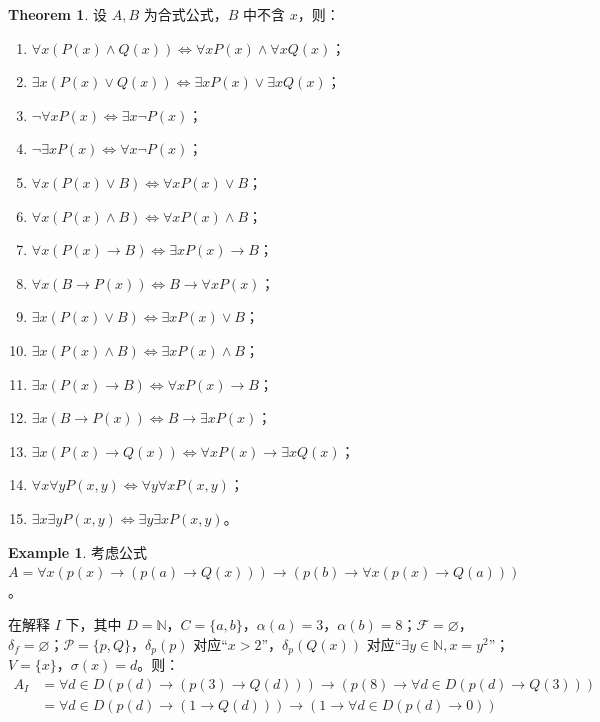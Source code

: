 \documentclass[oneside]{book}
\theoremstyle{definition}
\newtheorem{example}{Example}[section]
\newtheorem{theorem}{Theorem}[section]
\begin{document}
\begin{theorem}
	设 \( A,B \) 为合式公式，\( B \) 中不含 \( x \)，则：
	\begin{enumerate}
		\item \( \forall x(P(x) \land Q(x)) \Leftrightarrow \forall xP(x) \land \forall xQ(x) \)；
		\item \( \exists x(P(x) \lor Q(x)) \Leftrightarrow \exists xP(x) \lor \exists xQ(x) \)；
		\item \( \neg\forall xP(x) \Leftrightarrow \exists x\neg P(x) \)；
		\item \( \neg\exists xP(x) \Leftrightarrow \forall x\neg P(x) \)；
		\item \( \forall x(P(x) \lor B) \Leftrightarrow \forall xP(x) \lor B \)；
		\item \( \forall x(P(x) \land B) \Leftrightarrow \forall xP(x) \land B \)；
		\item \( \forall x(P(x) \to B) \Leftrightarrow \exists xP(x) \to B \)；
		\item \( \forall x(B \to P(x)) \Leftrightarrow B \to \forall xP(x) \)；
		\item \( \exists x(P(x) \lor B) \Leftrightarrow \exists xP(x) \lor B \)；
		\item \( \exists x(P(x) \land B) \Leftrightarrow \exists xP(x) \land B \)；
		\item \( \exists x(P(x) \to B) \Leftrightarrow \forall xP(x) \to B \)；
		\item \( \exists x(B \to P(x)) \Leftrightarrow B \to \exists xP(x) \)；
		\item \( \exists x(P(x) \to Q(x)) \Leftrightarrow \forall xP(x) \to \exists xQ(x) \)；
		\item \( \forall x\forall yP(x,y) \Leftrightarrow \forall y\forall xP(x,y) \)；
		\item \( \exists x\exists yP(x,y) \Leftrightarrow \exists y\exists xP(x,y) \)。
	\end{enumerate}
\end{theorem}
\begin{example}
	考虑公式 \( A = \forall x (p(x) \to (p(a) \to Q(x))) \to (p(b) \to \forall x (p(x) \to Q(a))) \)。
	
	在解释 \( I \) 下，其中 \( D = \mathbb{N} \)，\( C = \{ a, b \} \)，\( \alpha(a) = 3 \)，\( \alpha(b) = 8 \)；\( \mathcal{F} = \varnothing \)，\( \delta_f = \varnothing \)；\( \mathcal{P} = \{ p, Q \} \)，\( \delta_p(p) \) 对应“\( x > 2 \)”，\( \delta_p(Q(x)) \) 对应“\( \exists y \in \mathbb{N}, x = y^2 \)”；\( V = \{ x \} \)，\( \sigma(x) = d \)。则：
	\[
	\begin{aligned}
		A_I &= \forall d \in D (p(d) \to (p(3) \to Q(d))) \to (p(8) \to \forall d \in D (p(d) \to Q(3))) \\
		&= \forall d \in D (p(d) \to (1 \to Q(d))) \to (1 \to \forall d \in D (p(d) \to 0))
	\end{aligned}
	\]
\end{example}
\end{document}
